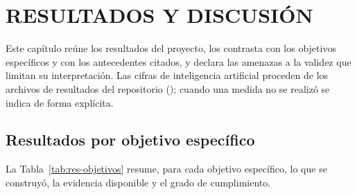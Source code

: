 \chapter{RESULTADOS Y DISCUSIÓN}
\label{cap:resultados}

Este capítulo reúne los resultados del proyecto, los contrasta con los
objetivos específicos y con los antecedentes citados, y declara las amenazas a
la validez que limitan su interpretación. Las cifras de inteligencia artificial
proceden de los archivos de resultados del repositorio
(); cuando una medida no se realizó se indica de forma
explícita.

\section{Resultados por objetivo específico}
\label{sec:res-objetivos}

La Tabla~\ref{tab:res-objetivos} resume, para cada objetivo específico, lo que
se construyó, la evidencia disponible y el grado de cumplimiento.

